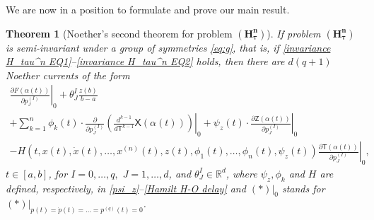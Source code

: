 \documentclass{my-aims}
\newtheorem{theorem}{Theorem}[section]
\theoremstyle{definition}
\begin{document}
We are now in a position to formulate and prove our main result.

\begin{theorem}[Noether's second  theorem for problem $\mathbf{(H_\tau^n)}$]
\label{thm 2_Noether}
If problem $\mathbf{(H_\tau^n)}$ is semi-invariant under a group 
of symmetries \eqref{eq:g}, that is, if  
\eqref{invariance H_tau^n EQ1}--\eqref{invariance H_tau^n EQ2}
holds, then there are $d(q+1)$ Noether currents of the form
\begin{multline*}
\left.\frac{\partial F(\alpha(t))}{\partial p_J^{(I)}}\right|_0+\theta_J^I\frac{z(b)}{b-a}\\
+ \sum_{k=1}^{n}\phi_k(t)\cdot \left. \frac{\partial }{\partial p_J^{(I)}}\left(\frac{d^{k-1}}{d\mathsf{T}^{k-1}}\mathsf{X}(\alpha(t))\right)\right|_0
+\psi_z(t)\cdot \left. \frac{\partial \mathsf{Z}(\alpha(t))}{\partial p_J^{(I)}}\right|_0\\
\left. -H(t,x(t),\dot{x}(t),\dots, x^{(n)}(t),z(t),\phi_1(t),
\dots,\phi_n(t),\psi_z(t))\frac{\partial \mathsf{T}(\alpha(t))}{\partial p_J^{(I)}}\right|_0,
\end{multline*}
$t \in [a,b]$, for $I=0,\dots,q,$ $J=1,\dots,d$, and $\theta^I_J \in \mathbb{R}^d$, 
where $\psi_z, \phi_k$ and $H$ are defined, respectively, in \eqref{psi_z}--\eqref{Hamilt H-O delay} 
and $\left.(*)\right|_0$ stands for $\left.(*)\right|_{p(t)=\dot{p}(t)=\dots=p^{(q)}(t)=0}$.
\end{theorem}
\end{document}
